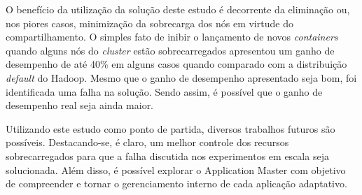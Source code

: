 O benefício da utilização da solução deste estudo é decorrente da eliminação ou, nos piores casos, minimização da sobrecarga dos nós em virtude do compartilhamento. O simples fato de inibir o lançamento de novos \textit{containers} quando alguns nós do \textit{cluster} estão sobrecarregados apresentou um ganho de desempenho de até 40\% em alguns casos quando comparado com a distribuição \textit{default} do Hadoop. Mesmo que o ganho de desempenho apresentado seja bom, foi identificada uma falha na solução. Sendo assim, é possível que o ganho de desempenho real seja ainda maior.

Utilizando este estudo como ponto de partida, diversos trabalhos futuros são possíveis. Destacando-se, é claro, um melhor controle dos recursos sobrecarregados para que a falha discutida nos experimentos em escala seja solucionada. Além disso, é possível explorar o Application Master com objetivo de compreender e tornar o gerenciamento interno de cada aplicação adaptativo.